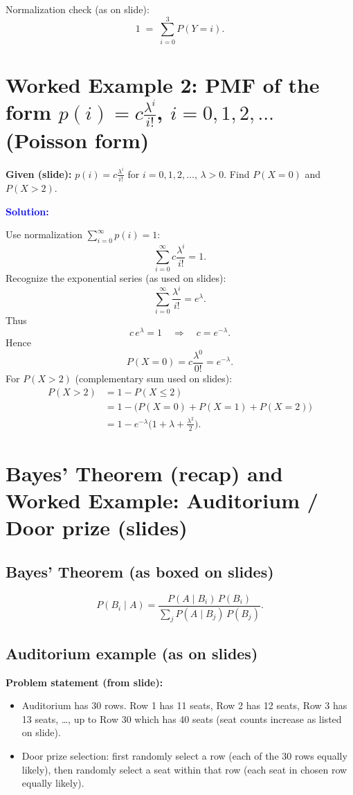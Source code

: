 \documentclass[11pt]{article}
\newcommand{\solution}{
    \vspace{0.5cm}
    \noindent\textbf{\textcolor{blue}{Solution:}}
    \vspace{0.2cm}
}
\begin{document}
\noindent Normalization check (as on slide):
\[
    1 \;=\; \sum_{i=0}^3 P(Y=i).
\]

\section{Worked Example 2: PMF of the form \(p(i)=c\frac{\lambda^i}{i!}\), \(i=0,1,2,\dots\) (Poisson form)}
\textbf{Given (slide):} \(p(i)=c\frac{\lambda^i}{i!}\) for \(i=0,1,2,\dots\), \(\lambda>0\). Find \(P(X=0)\) and \(P(X>2)\).

\solution

\noindent Use normalization \(\sum_{i=0}^{\infty} p(i)=1\):
\[
    \sum_{i=0}^{\infty} c\frac{\lambda^i}{i!}=1.
\]
Recognize the exponential series (as used on slides):
\[
    \sum_{i=0}^{\infty}\frac{\lambda^i}{i!}=e^{\lambda}.
\]
Thus
\[
    c\,e^{\lambda}=1 \quad\Rightarrow\quad c=e^{-\lambda}.
\]
Hence
\[
    P(X=0)=c\frac{\lambda^0}{0!}=e^{-\lambda}.
\]
For \(P(X>2)\) (complementary sum used on slides):
\[
    \begin{aligned}
        P(X>2) &= 1-P(X\le 2) \\
               &= 1-\big(P(X=0)+P(X=1)+P(X=2)\big) \\
               &= 1 - e^{-\lambda}\Big(1+\lambda+\tfrac{\lambda^2}{2}\Big).
    \end{aligned}
\]

\section{Bayes' Theorem (recap) and Worked Example: Auditorium / Door prize (slides)}
\subsection*{Bayes' Theorem (as boxed on slides)}
\[
    P(B_i\mid A)=\frac{P(A\mid B_i)\,P(B_i)}{\sum_j P(A\mid B_j)\,P(B_j)}.
\]

\subsection*{Auditorium example (as on slides)}
\textbf{Problem statement (from slide):}
\begin{itemize}
    \item Auditorium has 30 rows. Row 1 has 11 seats, Row 2 has 12 seats, Row 3 has 13 seats, \dots, up to Row 30 which has 40 seats (seat counts increase as listed on slide).
    \item Door prize selection: first randomly select a row (each of the 30 rows equally likely), then randomly select a seat within that row (each seat in chosen row equally likely).
\end{itemize}
\end{document}
